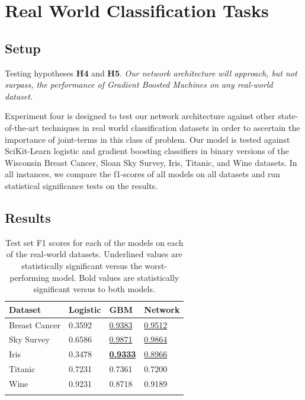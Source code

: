 \section{Real World Classification Tasks}

\subsection{Setup}

Testing hypotheses \textbf{H4} and \textbf{H5}. \textit{ Our network architecture will approach, but not surpass, the performance of Gradient Boosted Machines on any real-world dataset.}


Experiment four is designed to test our network architecture against other state-of-the-art techniques in real world classification datasets in order to ascertain the importance of joint-terms in this class of problem. Our model is tested against SciKit-Learn logistic and gradient boosting classifiers in binary versions of the Wisconsin Breast Cancer, Sloan Sky Survey, Iris, Titanic, and Wine datasets. In all instances, we compare the f1-scores of all models on all datasets and run statistical significance tests on the results. 

\subsection{Results}

\begin{longtable}[]{@{}llll@{}}
    \toprule
    Dataset & Logistic & GBM & Network\tabularnewline
    \midrule
    \endhead
    Breast Cancer & 0.3592 & \underline{0.9383} & \underline{0.9512}  \tabularnewline
    Sky Survey    & 0.6586 & \underline{0.9871} & \underline{0.9864}  \tabularnewline
    Iris          & 0.3478 & \underline{\textbf{0.9333}} & \underline{0.8966}  \tabularnewline
    Titanic       & 0.7231 & 0.7361 & 0.7200  \tabularnewline
    Wine          & 0.9231 & 0.8718 & 0.9189  \tabularnewline
    \bottomrule
    \caption{Test set F1 scores for each of the models on each of the real-world datasets. Underlined values are statistically significant versus the worst-performing model. Bold values are statistically significant versus to both models.}
\end{longtable}


